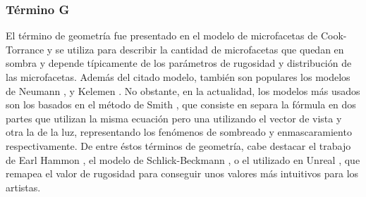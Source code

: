         \subsubsection*{T\'ermino G}
            El t\'ermino de geometr\'ia fue presentado en el modelo de microfacetas de Cook-Torrance \autocite{cooktorrance}
            y se utiliza para describir la cantidad de microfacetas que quedan en sombra y depende t\'ipicamente de los par\'ametros
            de rugosidad y distribuci\'on de las microfacetas. Adem\'as del citado modelo, tambi\'en son populares los modelos de
            Neumann \autocite{neumann}, y Kelemen \autocite{kelemen}. No obstante, en la actualidad, los modelos m\'as usados son los
            basados en el m\'etodo de Smith \autocite{smith}, que consiste en separa la f\'ormula en dos partes que utilizan la misma
            ecuaci\'on pero una utilizando el vector de vista y otra la de la luz, representando los fen\'omenos de sombreado y
            enmascaramiento respectivamente. De entre \'estos t\'erminos de geometr\'ia, cabe destacar el trabajo de Earl Hammon
            \autocite{earlhammon}, el modelo de Schlick-Beckmann \autocite{schlick}, o el utilizado en Unreal \autocite{unreal}, que remapea
            el valor de rugosidad para conseguir unos valores m\'as intuitivos para los artistas.
            



